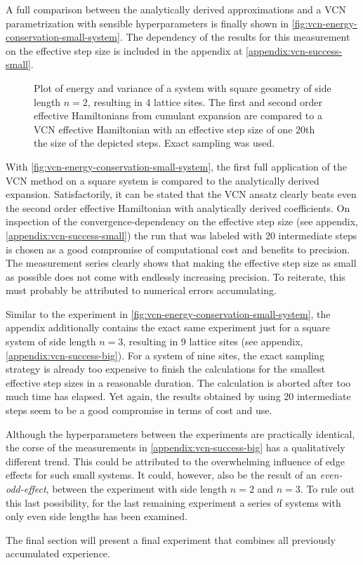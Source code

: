 A full comparison between the analytically derived approximations and a VCN parametrization with sensible hyperparameters is finally shown in \autoref{fig:vcn-energy-conservation-small-system}.
The dependency of the results for this measurement on the effective step size is included in the appendix at \ref{appendix:vcn-success-small}.

\begin{figure}[htbp]
    \centering
    \vspace{-0.5cm}
    \caption{
            Plot of energy and variance of a system with square geometry of side length $n=2$, resulting in 4 lattice sites.
            The first and second order effective Hamiltonians from cumulant expansion are compared to a VCN effective Hamiltonian with an effective step size of one 20th the size of the depicted steps.
            Exact sampling was used.
        }
    \label{fig:vcn-energy-conservation-small-system}
\end{figure}

With \autoref{fig:vcn-energy-conservation-small-system}, the first full application of the VCN method on a square system is compared to the analytically derived expansion.
Satisfactorily, it can be stated that the VCN ansatz clearly beats even the second order effective Hamiltonian with analytically derived coefficients.
On inspection of the convergence-dependency on the effective step size (see appendix, \ref{appendix:vcn-success-small}) the run that was labeled with 20 intermediate steps is chosen as a good compromise of computational cost and benefits to precision.
The measurement series clearly shows that making the effective step size as small as possible does not come with endlessly increasing precision.
To reiterate, this must probably be attributed to numerical errors accumulating.

Similar to the experiment in \autoref{fig:vcn-energy-conservation-small-system}, the appendix additionally contains the exact same experiment just for a square system of side length $n=3$, resulting in 9 lattice sites (see appendix, \ref{appendix:vcn-success-big}).
For a system of nine sites, the exact sampling strategy is already too expensive to finish the calculations for the smallest effective step sizes in a reasonable duration.
The calculation is aborted after too much time has elapsed.
Yet again, the results obtained by using 20 intermediate steps seem to be a good compromise in terms of cost and use.

Although the hyperparameters between the experiments are practically identical, the corse of the measurements in \ref{appendix:vcn-success-big} has a qualitatively different trend.
This could be attributed to the overwhelming influence of edge effects for such small systems. 
It could, however, also be the result of an \emph{even-odd-effect}, between the experiment with side length $n=2$ and $n=3$.
To rule out this last possibility, for the last remaining experiment a series of systems with only even side lengths has been examined.

The final section will present a final experiment that combines all previously accumulated experience.